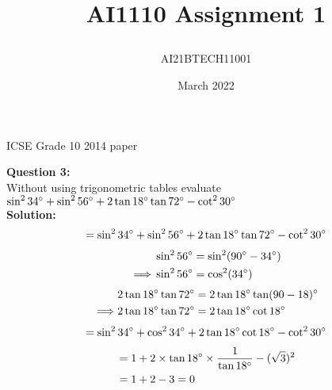 \documentclass[journal,12pt,twocolumn]{IEEEtran}
\title{\textbf{AI1110 Assignment 1}
\author{AI21BTECH11001 }}
\date{March 2022}
\begin{document}
\maketitle
\begin{center}
{ICSE Grade 10 2014 paper}\end{center}



\textbf{Question 3:}
\\
Without using trigonometric tables evaluate
\\
$\sin^2 34\degree+ \sin^2 56\degree+2\tan 18\degree \tan 72\degree - \cot^2 30\degree $ 
\\
\textbf{Solution:}
\begin{align}
= \sin^2 34\degree+ \sin^2 56\degree+2\tan 18\degree \tan 72\degree - \cot^2 30\degree
\end{align}
\begin{align}
 &\sin^2 56\degree = \sin^2 (90\degree - 34\degree)\\
  \implies&\sin^2 56\degree =\cos^2 (34\degree)
  \end{align}
  \begin{align}
  &2\tan18 \degree \tan72 \degree =  2\tan18 \degree \tan(90 - 18)\degree\\
  \implies &2 \tan18\degree    \tan72\degree = 2\tan18\degree\cot18\degree
 \end{align}
 \begin{align}
= \sin^2 34\degree +\cos^2 34\degree +2\tan18\degree \cot18\degree -\cot^2 30\degree
\end{align}
 \begin{align}
&= 1 + 2\times \tan18\degree \times\frac{1}{\tan18\degree} - (\sqrt{3})^2\\
&= 1 + 2 - 3
 = 0\end{align}
\end{document}
